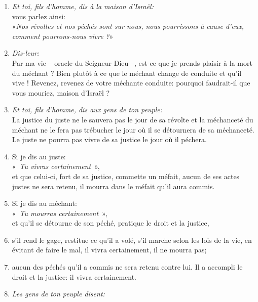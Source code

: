 \begin{enumerate}[leftmargin=\psleftmargin, labelsep = \pslabelsep, label={\arabic*}, font=\color{\pscolor}\small\textsuperscript, parsep=0em, itemsep=0em, topsep=0em ]
  \item {}\textit{Et toi, fils d’homme, dis à la maison d’Israël:} \\
        vous parlez ainsi: \\
        «\textit{Nos révoltes et nos péchés sont sur nous, \brk
          nous pourrissons à cause d’eux, \brk
          comment pourrons-nous vivre ?}»
  \item {}\textit{Dis-leur:}\\
        Par ma vie – oracle du Seigneur Dieu –, \brk
        est-ce que je prends plaisir à la mort du méchant ? \brk
        Bien plutôt à ce que le méchant change de conduite et qu’il vive ! \brk
        Revenez, revenez de votre méchante conduite: \brk
        pourquoi faudrait-il que vous mouriez, maison d’Israël ? \newpage
  \item {}\textit{Et toi, fils d’homme, dis aux gens de ton peuple:} \\
        La justice du juste ne le sauvera pas \brk
        le jour de sa révolte \brk
        et la méchanceté du méchant ne le fera pas trébucher \brk
        le jour où il se détournera de sa méchanceté.\brk
        Le juste ne pourra pas vivre de sa justice \brk
        le jour où il péchera. \verseSpace
  \item {}Si je dis au juste: \\
        «~\textit{Tu vivras certainement}~», \\
        et que celui-ci, fort de sa justice, commette un méfait, \brk
        aucun de ses actes justes ne sera retenu, \brk
        il mourra dans le méfait qu’il aura commis.
  \item {}Si je dis au méchant: \\
        «~\textit{Tu mourras certainement}~», \\
        et qu’il se détourne de son péché, pratique le droit et la justice,
  \item {}s’il rend le gage, restitue ce qu’il a volé, \brk
        s’il marche selon les lois de la vie, en évitant de faire le mal, \brk
        il vivra certainement, il ne mourra pas;
  \item {}aucun des péchés qu’il a commis ne sera retenu contre lui. \brk
        Il a accompli le droit et la justice: il vivra certainement. \verseSpace
  \item {}\textit{Les gens de ton peuple disent:} \\

\end{enumerate}
